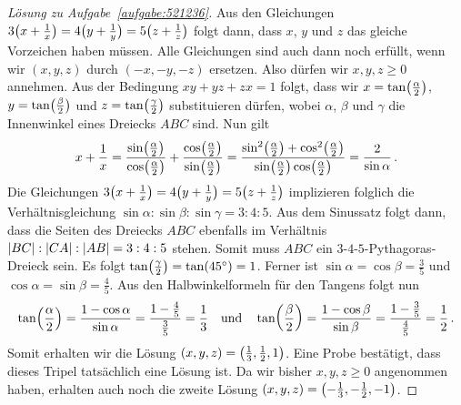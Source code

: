 \begin{proof}[Lösung zu Aufgabe~\ref{aufgabe:521236}]
	Aus den Gleichungen $3\parens[\big]{x+\frac1x}=4\parens[\big]{y+\frac1y}=5\parens[\big]{z+\frac1z}$ folgt dann, dass $x$, $y$ und $z$ das gleiche Vorzeichen haben müssen. Alle Gleichungen sind auch dann noch erfüllt, wenn wir $(x,y,z)$ durch $(-x,-y,-z)$ ersetzen. Also dürfen wir $x,y,z\geqslant 0$ annehmen. Aus der Bedingung $xy+yz+zx=1$ folgt, dass wir $x=\tan\parens[\big]{\frac{\alpha}2}$, $y=\tan\parens[\big]{\frac{\beta}2}$ und $z=\tan\parens[\big]{\frac{\gamma}2}$ substituieren dürfen, wobei $\alpha$, $\beta$ und $\gamma$ die Innenwinkel eines Dreiecks $ABC$ sind. Nun gilt
	\begin{equation*}
		x+\frac 1x=\frac{\sin \parens[\big]{\frac{\alpha}2}}{\cos\parens[\big]{\frac{\alpha}2}}+\frac{\cos\parens[\big]{\frac{\alpha}2}}{\sin\parens[\big]{\frac{\alpha}2}}=\frac{\sin^2\parens[\big]{\frac{\alpha}2}+\cos^2\parens[\big]{\frac{\alpha}2}}{\sin \parens[\big]{\frac{\alpha}2}\cos\parens[\big]{\frac{\alpha}2}}=\frac2{\sin\alpha}\,.
	\end{equation*}
	Die Gleichungen $3\parens[\big]{x+\frac1x}=4\parens[\big]{y+\frac1y}=5\parens[\big]{z+\frac1z}$ implizieren folglich die Verhältnisgleichung $\sin\alpha:\sin\beta:\sin\gamma=3:4:5$. Aus dem Sinussatz folgt dann, dass die Seiten des Dreiecks $ABC$ ebenfalls im Verhältnis $\abs*{BC}:\abs*{CA}:\abs*{AB}=3:4:5$ stehen. Somit muss $ABC$ ein $3$-$4$-$5$-Pythagoras-Dreieck sein. Es folgt $\tan \parens[\big]{\frac{\gamma}2}=\tan(45^\circ)=1$. Ferner ist $\sin\alpha=\cos\beta=\frac 35$ und $\cos\alpha=\sin\beta=\frac 45$. Aus den Halbwinkelformeln für den Tangens folgt nun
	\begin{equation*}
		\tan \parens*{\frac{\alpha}2}=\frac{1-\cos\alpha}{\sin\alpha}=\frac{1-\frac{4}{5}}{\frac{3}{5}}=\frac13\quad \text{und}\quad \tan \parens*{\frac{\beta}2}=\frac{1-\cos\beta}{\sin\beta}=\frac{1-\frac{3}{5}}{\frac{4}{5}}=\frac12\,.
	\end{equation*}
	Somit erhalten wir die Lösung $(x,y,z)=\parens[\big]{\frac13,\frac12,1}$. Eine Probe bestätigt, dass dieses Tripel tatsächlich eine Lösung ist. Da wir bisher $x,y,z\geqslant 0$ angenommen haben, erhalten auch noch die zweite Lösung $(x,y,z)=\parens[\big]{-\frac13,-\frac12,-1}$.
\end{proof}

